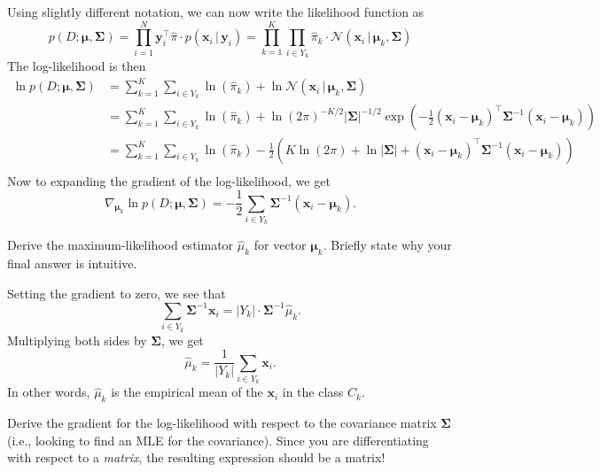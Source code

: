 \documentclass[expanded]{lkx_pset}
\begin{document}
\begin{parts}
	Using slightly different notation, we can now write the likelihood function as
	\[
		p(D; \bm{\mu}, \bm{\Sigma}) = \prod_{i=1}^N \bm{y}_i^\intercal \widehat{\pi}\cdot p(\bm{x}_i \,|\, \bm{y}_i) =
		\prod_{k=1}^K \prod_{i\in Y_k} \widehat{\pi}_k\cdot \mathcal{N}(\bm{x}_i\,|\,\bm{\mu}_k, \bm{\Sigma})
	\]
	The log-likelihood is then
	\[
		\begin{aligned}
			\ln p(D; \bm{\mu}, \bm{\Sigma})
			 & = \sum_{k=1}^K\sum_{i\in Y_k} \ln(\widehat{\pi}_k) + \ln \mathcal{N}(\bm{x}_i \,|\, \bm{\mu}_{k}, \bm{\Sigma}) \\
			 & = \sum_{k=1}^K\sum_{i\in Y_k}
			\ln(\widehat{\pi}_k) + \ln (2\pi)^{-K/2}
			|\bm{\Sigma}|^{-1/2}
			\exp\left(-\frac{1}{2}\left(\bm{x}_i - \bm{\mu}_{k}\right)^\intercal
			\bm{\Sigma}^{-1} \left(\bm{x}_i - \bm{\mu}_{k}\right)\right)
			\\
			 & = \sum_{k=1}^K \sum_{i\in Y_k}
			\ln(\widehat{\pi}_k) -
			\frac{1}{2}\left(K \ln (2\pi) +
			\ln |\bm{\Sigma}| +
			\left(\bm{x}_i - \bm{\mu}_{k}\right)^\intercal
			\bm{\Sigma}^{-1}
			\left(\bm{x}_i - \bm{\mu}_{k}\right)\right)                                                                       \\
		\end{aligned}
	\]
	Now to expanding the gradient of the log-likelihood, we get
	\[
		\nabla_{\bm\mu_k} \ln p(D; \bm{\mu}, \bm\Sigma) = -\frac{1}{2}\sum_{i\in Y_k} \bm\Sigma^{-1}(\bm{x}_i - \bm{\mu}_k).
	\]

	\begin{part}{4}
		Derive the maximum-likelihood estimator $\widehat{\mu}_k$ for vector $\bm{\mu}_k$. Briefly state why your final answer is intuitive.
	\end{part}

	Setting the gradient to zero, we see that
	\[
		\sum_{i\in Y_k} \bm\Sigma^{-1} \bm{x}_i = |Y_k|\cdot \bm\Sigma^{-1}\widehat{\mu}_k.
	\]
	Multiplying both sides by $\bm\Sigma$, we get
	\[
		\widehat{\mu}_k = \frac{1}{|Y_k|}\sum_{i\in Y_k} \bm{x}_i.
	\]
	In other words, $\widehat{\mu}_k$ is the empirical mean of the $\bm{x}_i$ in the class $C_k$.

	\begin{part}{5}
		Derive the gradient for the log-likelihood with respect to the
		covariance matrix $\bm{\Sigma}$ (i.e., looking
		to find an MLE for the covariance).
		Since you are differentiating with respect to a
		\emph{matrix}, the resulting expression should be a matrix!
	\end{part}


\end{parts}
\end{document}
